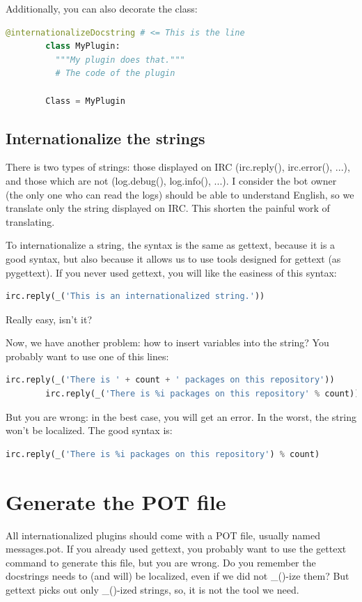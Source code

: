 \documentclass[a4paper,11pt]{article}
\begin{document}
      Additionally, you can also decorate the class:
      \begin{lstlisting}[language=python]
        @internationalizeDocstring # <= This is the line
        class MyPlugin:
          """My plugin does that."""
          # The code of the plugin
        
        Class = MyPlugin
      \end{lstlisting}
      
    \subsection{Internationalize the strings}
      There is two types of strings: those displayed on IRC (irc.reply(),
      irc.error(), ...), and those which are not (log.debug(), log.info(),
      ...).
      I consider the bot owner (the only one who can read the logs) should
      be able to understand English, so we translate only the string displayed
      on IRC. This shorten the painful work of translating.
      
      To internationalize a string, the syntax is the same as gettext, because
      it is a good syntax, but also because it allows us to use tools designed
      for gettext (as pygettext). If you never used gettext, you will like
      the easiness of this syntax:
      \begin{lstlisting}[language=python]
        irc.reply(_('This is an internationalized string.'))
      \end{lstlisting}
      Really easy, isn't it?
      
      Now, we have another problem: how to insert variables into the string?
      You probably want to use one of this lines:
      \begin{lstlisting}[language=python]
        irc.reply(_('There is ' + count + ' packages on this repository'))
        irc.reply(_('There is %i packages on this repository' % count))
      \end{lstlisting}
      But you are wrong: in the best case, you will get an error. In the
      worst, the string won't be localized.
      The good syntax is:
      \begin{lstlisting}[language=python]
        irc.reply(_('There is %i packages on this repository') % count)
      \end{lstlisting}
  
  \section{Generate the POT file}
    All internationalized plugins should come with a POT file, usually named
    \mbox{messages.pot}.
    If you already used gettext, you probably want to use the gettext command
    to generate this file, but you are wrong. Do you remember the docstrings
    needs to (and will) be localized, even if we did not \_()-ize them? But
    gettext picks out only \_()-ized strings, so, it is not the tool we need.
    
\end{document}

